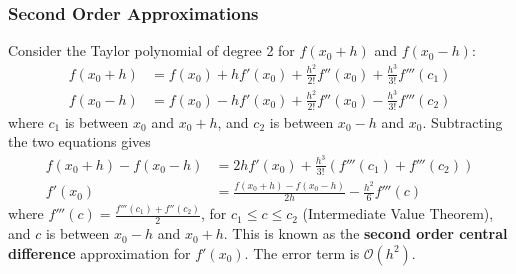 \documentclass{article}
\begin{document}
\subsubsection{Second Order Approximations}
Consider the Taylor polynomial of degree 2 for \(f\left( x_0 + h
\right)\) and \(f\left( x_0 - h \right)\):
\begin{align*}
    f\left( x_0 + h \right) & = f\left( x_0 \right) + h f'\left( x_0 \right) + \frac{h^2}{2!} f''\left( x_0 \right) + \frac{h^3}{3!} f'''\left( c_1 \right) \\
    f\left( x_0 - h \right) & = f\left( x_0 \right) - h f'\left( x_0 \right) + \frac{h^2}{2!} f''\left( x_0 \right) - \frac{h^3}{3!} f'''\left( c_2 \right)
\end{align*}
where \(c_1\) is between \(x_0\) and \(x_0 + h\), and \(c_2\) is between
\(x_0 - h\) and \(x_0\). Subtracting the two equations gives
\begin{align*}
    f\left( x_0 + h \right) - f\left( x_0 - h \right) & = 2h f'\left( x_0 \right) + \frac{h^3}{3!} \left( f'''\left( c_1 \right) + f'''\left( c_2 \right) \right) \\
    f'\left( x_0 \right)                              & = \frac{f\left( x_0 + h \right) - f\left( x_0 - h \right)}{2h} - \frac{h^2}{6} f'''\left( c \right)
\end{align*}
where \(f'''\left( c \right) = \frac{f'''\left( c_1 \right) +
    f''\left( c_2 \right)}{2}\), for \(c_1 \leq c \leq c_2\) (Intermediate
Value Theorem), and \(c\) is between \(x_0 - h\) and \(x_0 + h\). This
is known as the \textbf{second order central difference} approximation
for \(f'\left( x_0 \right)\). The error term is
\(\mathcal{O}\left( h^2 \right)\).
\end{document}
